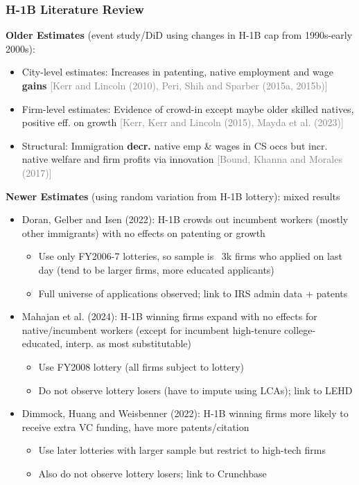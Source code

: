 \documentclass[xcolor=dvipsnames, compress, 12pt, aspectratio=169, handout]{beamer}
\begin{document}
\appendix 

\begin{frame}[allowframebreaks]\label{h1blit}
    \frametitle{H-1B Literature Review \hyperlink{intro}{}}
    \textbf{Older Estimates} (event study/DiD using changes in H-1B cap from 1990s-early 2000s): 
    \begin{itemize}
        \item City-level estimates: Increases in patenting, native employment and wage \textbf{gains} \textcolor{gray}{[Kerr and Lincoln (2010), Peri, Shih and Sparber (2015a, 2015b)]}
        \item Firm-level estimates: Evidence of crowd-in except maybe older skilled natives, positive eff. on growth \textcolor{gray}{[Kerr, Kerr and Lincoln (2015), Mayda et al. (2023)]}
        \item Structural: Immigration \textbf{decr.} native emp \& wages in CS occs but incr. native welfare and firm profits via innovation \textcolor{gray}{[Bound, Khanna and Morales (2017)]}
    \end{itemize}
    \textbf{Newer Estimates} (using random variation from H-1B lottery): mixed results
    \begin{itemize}
        \item Doran, Gelber and Isen (2022): H-1B crowds out incumbent workers (mostly other immigrants) with no effects on patenting or growth
        \begin{itemize}
            \item Use only FY2006-7 lotteries, so sample is ~3k firms who applied on last day (tend to be larger firms, more educated applicants)
            \item Full universe of applications observed; link to IRS admin data + patents 
        \end{itemize}
        \item Mahajan et al. (2024): H-1B winning firms expand with no effects for native/incumbent workers (except for incumbent high-tenure college-educated, interp. as most substitutable)
        \begin{itemize}
            \item Use FY2008 lottery (all firms subject to lottery)
            \item Do not observe lottery losers (have to impute using LCAs); link to LEHD
        \end{itemize}
        \item Dimmock, Huang and Weisbenner (2022): H-1B winning firms more likely to receive extra VC funding, have more patents/citation
        \begin{itemize}
            \item Use later lotteries with larger sample but restrict to high-tech firms
            \item Also do not observe lottery losers; link to Crunchbase
        \end{itemize}
    \end{itemize}
\end{frame}
\end{document}
